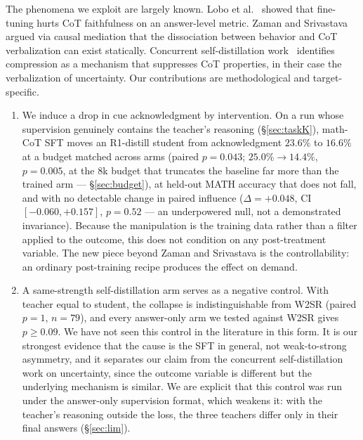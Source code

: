 \documentclass{article}
\begin{document}
The phenomena we exploit are largely known. Lobo et al.~\cite{lobo2024} showed
that fine-tuning hurts CoT faithfulness on an answer-level metric. Zaman and
Srivastava~\cite{zaman2025} argued via causal mediation that the dissociation
between behavior and CoT verbalization can exist statically. Concurrent
self-distillation work~\cite{selfdistill2026} identifies compression as a
mechanism that suppresses CoT properties, in their case the verbalization of
uncertainty. Our contributions are methodological and target-specific.

\begin{enumerate}

\item We induce a drop in cue acknowledgment by intervention. On a run whose
supervision genuinely contains the teacher's reasoning (\S\ref{sec:taskK}),
math-CoT SFT moves an R1-distill student from acknowledgment $23.6\%$ to
$16.6\%$ at a budget matched across arms (paired $p = 0.043$;
$25.0\%\!\to\!14.4\%$, $p = 0.005$, at the 8k budget that truncates the
baseline far more than the trained arm --- \S\ref{sec:budget}), at held-out
MATH accuracy that does not fall,
and with no detectable change in paired influence ($\Delta = +0.048$,
CI $[-0.060, +0.157]$, $p = 0.52$ --- an underpowered null, not a demonstrated
invariance). Because the manipulation is the training data rather than a filter
applied to the outcome, this does not condition on any post-treatment variable.
The new piece beyond Zaman and Srivastava is the controllability: an ordinary
post-training recipe produces the effect on demand.

\item A same-strength self-distillation arm serves as a negative control. With
teacher equal to student, the collapse is indistinguishable from W2SR
(paired $p\!=\!1$, $n\!=\!79$), and every answer-only arm we tested against
W2SR gives $p\!\ge\!0.09$. We have not seen this control in the literature in
this form. It is our strongest evidence that the cause is the SFT in general,
not weak-to-strong asymmetry, and it separates our claim from the concurrent
self-distillation work on uncertainty, since the outcome variable is different
but the underlying mechanism is similar. We are explicit that this control was
run under the answer-only supervision format, which weakens it: with the
teacher's reasoning outside the loss, the three teachers differ only in their
final answers (\S\ref{sec:lim}).


\end{enumerate}
\end{document}
